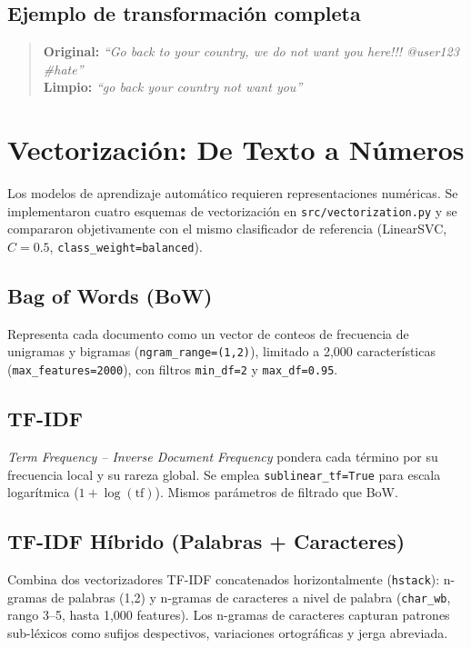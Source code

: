 ﻿\documentclass[12pt,a4paper]{article}
\begin{document}
\subsection{Ejemplo de transformación completa}
\begin{quote}
\textbf{Original:} \textit{``Go back to your country, we do not want you
here!!! @user123 \#hate''}\\
\textbf{Limpio:} \textit{``go back your country not want you''}
\end{quote}

\section{Vectorización: De Texto a Números}
\label{sec:vectorization}

Los modelos de aprendizaje automático requieren representaciones numéricas.
Se implementaron cuatro esquemas de vectorización en
\texttt{src/vectorization.py} y se compararon objetivamente con el mismo
clasificador de referencia (LinearSVC, $C=0.5$, \texttt{class\_weight=balanced}).

\subsection{Bag of Words (BoW)}
Representa cada documento como un vector de conteos de frecuencia de
unigramas y bigramas (\texttt{ngram\_range=(1,2)}), limitado a 2,000
características (\texttt{max\_features=2000}), con filtros
\texttt{min\_df=2} y \texttt{max\_df=0.95}.

\subsection{TF-IDF}
\textit{Term Frequency -- Inverse Document Frequency} pondera cada término
por su frecuencia local y su rareza global. Se emplea
\texttt{sublinear\_tf=True} para escala logarítmica ($1 + \log(\text{tf})$).
Mismos parámetros de filtrado que BoW.

\subsection{TF-IDF Híbrido (Palabras + Caracteres)}
Combina dos vectorizadores TF-IDF concatenados horizontalmente
(\texttt{hstack}): n-gramas de palabras (1,2) y n-gramas de caracteres a
nivel de palabra (\texttt{char\_wb}, rango 3--5, hasta 1,000 features).
Los n-gramas de caracteres capturan patrones sub-léxicos como sufijos
despectivos, variaciones ortográficas y jerga abreviada.
\end{document}
